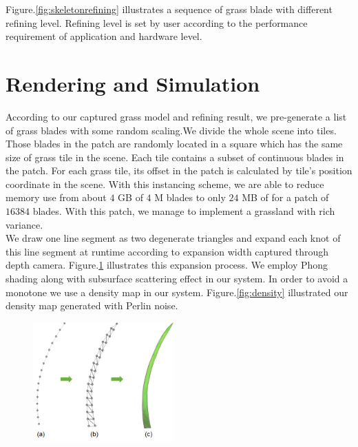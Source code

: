 \documentclass[10pt,journal,compsoc]{IEEEtran}
\begin{document}
Figure.\ref{fig:skeletonrefining} illustrates a sequence of grass blade with different refining level. Refining level is set by user according to the performance requirement of application and hardware level.

\section{Rendering and Simulation}\label{sec:render}
According to our captured grass model and refining result, we pre-generate a list of grass blades with some random scaling.We divide the whole scene into tiles. Those blades in the patch are randomly located in a square which has the same size of grass tile in the scene. Each tile contains a subset of continuous blades in the patch. For each grass tile, its offset in the patch is calculated by tile's position coordinate in the scene. With this instancing scheme, we are able to reduce memory use from about $4$ GB of $4$ M blades to only $24$ MB of for a patch of $16384$ blades. With this patch, we manage to implement a grassland with rich variance.\\

We draw one line segment as two degenerate triangles and expand each knot of this line segment at runtime according to expansion width captured through depth camera. Figure.\ref{fig:expasion} illustrates this expansion process. We employ Phong shading along with subsurface scattering effect\cite{sousa2007vegetation} in our system. In order to avoid a monotone we use a density map in our system. Figure.\ref{fig:density} illustrated our density map generated with Perlin noise\cite{perlin1985image}. \\

\begin{figure}
    \centering
    \includegraphics[width=0.48\textwidth]{figs/expansion.jpg}
    \label{fig:expasion}
\end{figure}
\end{document}
